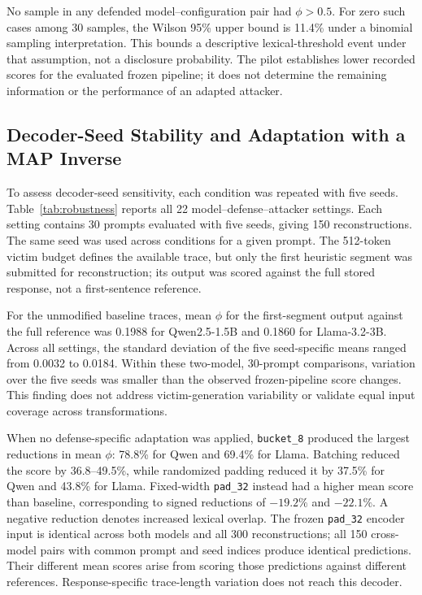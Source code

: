 \documentclass[electronics,article,submit,pdftex,moreauthors]{Definitions/mdpi}
\begin{document}
No sample in any defended model--configuration pair had $\phi>0.5$. For zero such cases among 30 samples, the Wilson 95\% upper bound is 11.4\% under a binomial sampling interpretation. This bounds a descriptive lexical-threshold event under that assumption, not a disclosure probability. The pilot establishes lower recorded scores for the evaluated frozen pipeline; it does not determine the remaining information or the performance of an adapted attacker.

\subsection{Decoder-Seed Stability and Adaptation with a MAP Inverse}\label{sec:robustness}
To assess decoder-seed sensitivity, each condition was repeated with five seeds. Table~\ref{tab:robustness} reports all 22 model--defense--attacker settings. Each setting contains 30 prompts evaluated with five seeds, giving 150 reconstructions. The same seed was used across conditions for a given prompt. The 512-token victim budget defines the available trace, but only the first heuristic segment was submitted for reconstruction; its output was scored against the full stored response, not a first-sentence reference.

For the unmodified baseline traces, mean $\phi$ for the first-segment output against the full reference was 0.1988 for Qwen2.5-1.5B and 0.1860 for Llama-3.2-3B. Across all settings, the standard deviation of the five seed-specific means ranged from 0.0032 to 0.0184. Within these two-model, 30-prompt comparisons, variation over the five seeds was smaller than the observed frozen-pipeline score changes. This finding does not address victim-generation variability or validate equal input coverage across transformations.

When no defense-specific adaptation was applied, \texttt{bucket\_8} produced the largest reductions in mean $\phi$: 78.8\% for Qwen and 69.4\% for Llama. Batching reduced the score by 36.8--49.5\%, while randomized padding reduced it by 37.5\% for Qwen and 43.8\% for Llama. Fixed-width \texttt{pad\_32} instead had a higher mean score than baseline, corresponding to signed reductions of $-19.2\%$ and $-22.1\%$. A negative reduction denotes increased lexical overlap. The frozen \texttt{pad\_32} encoder input is identical across both models and all 300 reconstructions; all 150 cross-model pairs with common prompt and seed indices produce identical predictions. Their different mean scores arise from scoring those predictions against different references. Response-specific trace-length variation does not reach this decoder.
\end{document}
